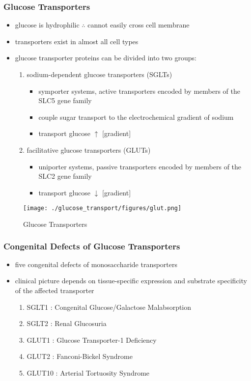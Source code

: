 \documentclass{scrartcl}
\begin{document}
\subsubsection{Glucose Transporters}
\label{sec:orgdbb9126}
\begin{itemize}
\item glucose is hydrophilic \(\therefore\) cannot easily cross cell membrane
\item transporters exist in almost all cell types
\item glucose transporter proteins can be divided into two groups:
\begin{enumerate}
\item sodium-dependent glucose transporters (SGLTs)
\begin{itemize}
\item symporter systems, active transporters encoded by members of
the SLC5 gene family
\item couple sugar transport to the electrochemical gradient of sodium
\item transport glucose \(\uparrow\) [gradient]
\end{itemize}
\item facilitative glucose transporters (GLUTs)
\begin{itemize}
\item uniporter systems, passive transporters encoded by members of the SLC2 gene family
\item transport glucose \(\downarrow\) [gradient]
\end{itemize}
\end{enumerate}
\end{itemize}

\begin{figure}[htbp]
\centering
\texttt{[image: ./glucose\_transport/figures/glut.png]}
\caption[glucose transporters]{\label{fig:org7affc9e}
Glucose Transporters}
\end{figure}

\subsubsection{Congenital Defects of Glucose Transporters}
\label{sec:org9dba10c}
\begin{itemize}
\item five congenital defects of monosaccharide transporters
\item clinical picture depends on tissue-specific expression and
substrate specificity of the affected transporter

\begin{enumerate}
\item SGLT1 : Congenital Glucose/Galactose Malabsorption
\item SGLT2 : Renal Glucosuria
\item GLUT1 : Glucose Transporter-1 Deficiency
\item GLUT2 : Fanconi-Bickel Syndrome
\item GLUT10 : Arterial Tortuosity Syndrome
\end{enumerate}
\end{itemize}
\end{document}
